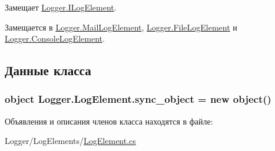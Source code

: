 Замещает \hyperlink{interface_logger_1_1_i_log_element_a9b99e1d38af59d984109975adcf29441}{Logger.\+I\+Log\+Element}.



Замещается в \hyperlink{class_logger_1_1_mail_log_element_a97a0e43476c50853747f8d7b00cab465}{Logger.\+Mail\+Log\+Element}, \hyperlink{class_logger_1_1_file_log_element_aa5ec6e083f5ed5f08e56971efa676833}{Logger.\+File\+Log\+Element} и \hyperlink{class_logger_1_1_console_log_element_ae373fa855a7146b970afe22ddd184048}{Logger.\+Console\+Log\+Element}.



\subsection{Данные класса}
\hypertarget{class_logger_1_1_log_element_a976cb30e9e3aa8d1a6fc942220b0a16b}{}
\subsubsection[{sync\+\_\+object}]{\setlength{\rightskip}{0pt plus 5cm}object Logger.\+Log\+Element.\+sync\+\_\+object = new object()\hspace{0.3cm}{\ttfamily [protected]}}\label{class_logger_1_1_log_element_a976cb30e9e3aa8d1a6fc942220b0a16b}


Объявления и описания членов класса находятся в файле\+:\begin{DoxyCompactItemize}
\item 
Logger/\+Log\+Elements/\hyperlink{_log_element_8cs}{Log\+Element.\+cs}\end{DoxyCompactItemize}
